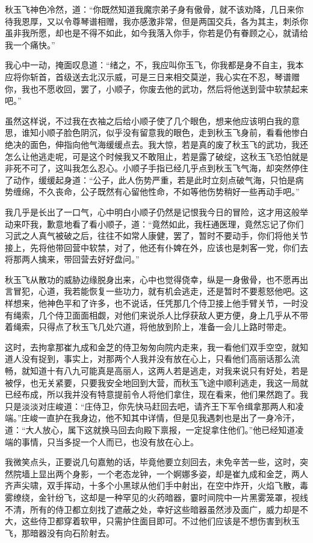 秋玉飞神色冷然，道：“你既然知道我魔宗弟子身有傲骨，就不该劝降，几日来你待我恩厚，又以令尊琴谱相赠，我亦感激非常，但是两国交兵，各为其主，刺杀你虽非我所愿，却也是不得不如此，如今我落入你手，你若是仍有眷顾之心，就请给我一个痛快。”

我心中一动，掩面叹息道：“绪之，不，我应叫你玉飞，你我都是身不自主，我本应将你斩首，首级送去北汉示威，可是三日来相交莫逆，我心实在不忍，琴谱赠你，我也不愿收回，罢了，小顺子，你废去他的武功，然后将他送到营中软禁起来吧。”

虽然这样说，不过我在衣袖之后给小顺子使了几个眼色，想来他应该明白我的意思，谁知小顺子脸色阴沉，似乎没有留意我的眼色，走到秋玉飞身前，看看他惨白绝决的面色，伸指向他气海缓缓点去。我大惊，若是真的废了秋玉飞的武功，我还怎么让他逃走呢，可是这个时候我又不敢阻止，若是露了破绽，这秋玉飞恐怕就是非死不可了，这叫我怎么忍心。小顺子手指已经几乎点到秋玉飞气海，却突然停住了动作，缓缓起身道：“公子，此人伤势严重，若是此时立刻点破气海，只怕是病势缠绵，不久丧命，公子既然有心留他性命，不如等他伤势稍好一些再动手吧。”

我几乎是长出了一口气，心中明白小顺子仍然是记恨我今日的冒险，这才用这般举动来吓我，歉意地看了看小顺子，道：“竟然如此，我枉通医理，竟然忘记了你们习武之人真气被破之后，往往不如常人康健，罢了，暂时不要动手，你们将他关节接上，先将他带回营中软禁，对了，他还有仆婢在外，应该也是刺客一党，你们去将那两人擒来，带回营去好好盘问。”

秋玉飞从散功的威胁边缘脱身出来，心中也觉得侥幸，纵是一身傲骨，也不愿再出言冒犯，心道，我若能恢复一些功力，就有机会逃走，还是暂时不要惹怒他吧。这样想来，他神色平和了许多，也不说话，任凭那几个侍卫接上他手臂关节，一时没有绳索，几个侍卫面面相觑，对他们来说杀人比俘获敌人更方便，身上几乎从不带着绳索，只得点了秋玉飞几处穴道，将他放到阶上，准备一会儿上路时带走。

这时，去拘拿那崔九成和金芝的侍卫匆匆向院内走来，我一看他们双手空空，就知道人没有捉到，事实上，对那两个人我并没有放在心上，只看他们高丽话那么流畅，就知道十有八九可能真是高丽人，这两人若是逃走，对我来说只有好处，若是被俘，也无关紧要，只要我安全地回到大营，而秋玉飞途中顺利逃走，我这一局就已经布成，所以我并没有特意提前令人将他们拿住，现在看来，他们果然跑了。我只是淡淡对庄峻道：“庄侍卫，你先快马赶回去吧，请齐王下军令缉拿那两人和凌端。”庄峻一直护在我身边，他不知其中详情，但是见我遇刺也是出了一身冷汗，道：“大人放心，属下这就换马回去向殿下禀报，一定捉拿住他们。”他已经知道凌端的事情，只当多捉一个人而已，也没有放在心上。

我微笑点头，正要说几句嘉勉的话，毕竟他要立刻回去，未免辛苦一些，这时，突然院墙上显出两个身影，一个老态龙钟，一个婀娜多姿，却是崔九成和金芝，两人齐声尖啸，双手挥动，十多个小黑球从他们手中射出，在空中炸开，火焰飞散，毒雾缭绕，金针纷飞，这却是一种罕见的火药暗器，霎时间院中一片黑雾笼罩，视线不清，所有的侍卫都立刻找了遮蔽之处，幸好这些暗器虽然涉及面广，威力却是不大，这些侍卫都穿着软甲，只需护住面目即可。不过他们应该是不想伤害到秋玉飞，那暗器没有向石阶射去。

